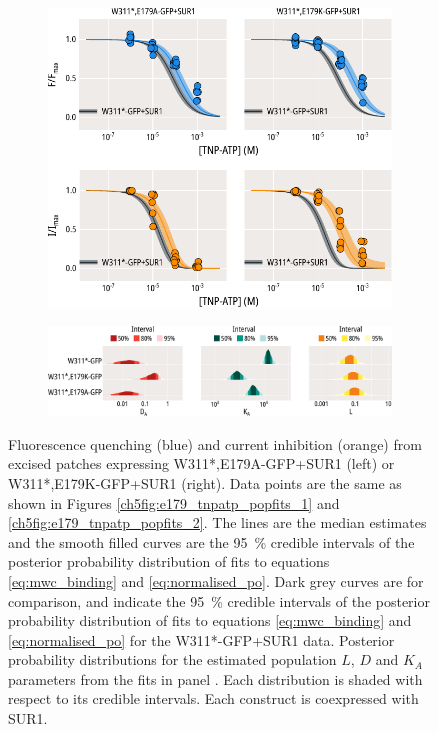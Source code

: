 \begin{figure}[hbtp]
	\centering
	\begin{subfigure}[t]{0.9\textwidth}
		\caption{}\label{ch5fig:mwc_e179_1}
		\centering
		\includegraphics[width=\textwidth]{mwc_e179_1.pdf}
	\end{subfigure}
	\vfill
	\begin{subfigure}[t]{0.9\textwidth}
		\caption{}\label{ch5fig:mwc_e179_2}
		\centering
		\includegraphics[width=\textwidth]{mwc_e179_2.pdf}
	\end{subfigure}
	\caption[E179 mutations affect gating and nucleotide binding]{
	{\bf{}}
	 Fluorescence quenching (blue) and current inhibition (orange) from excised patches expressing W311*,E179A-GFP+SUR1 (left) or W311*,E179K-GFP+SUR1 (right).
	Data points are the same as shown in Figures \ref{ch5fig:e179_tnpatp_popfits_1} and \ref{ch5fig:e179_tnpatp_popfits_2}.
	The lines are the median estimates and the smooth filled curves are the \SI{95}{\percent} credible intervals of the posterior probability distribution of fits to equations \ref{eq:mwc_binding} and \ref{eq:normalised_po}.
	Dark grey curves are for comparison, and indicate the \SI{95}{\percent} credible intervals of the posterior probability distribution of fits to equations \ref{eq:mwc_binding} and \ref{eq:normalised_po} for the W311*-GFP+SUR1 data.
	 Posterior probability distributions for the estimated population $L$, $D$ and $K_A$ parameters from the fits in panel .
	Each distribution is shaded with respect to its credible intervals.
	Each construct is coexpressed with SUR1.
	}\label{ch5fig:e179_2}
\end{figure}

